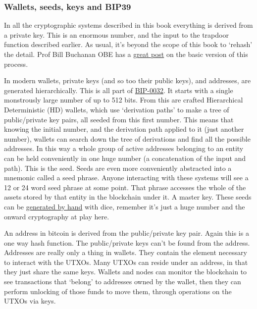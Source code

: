 \subsubsection{Wallets, seeds, keys and BIP39}
In all the cryptographic systems described in this book everything is derived from a private key. This is an enormous number, and the input to the trapdoor function described earlier. As usual, it's beyond the scope of this book to `rehash' the detail. Prof Bill Buchanan OBE has a \href{https://medium.com/asecuritysite-when-bob-met-alice/can-i-derive-the-private-key-from-the-public-key-ba3609256ec}{great post} on the basic version of this process.\par
In modern wallets, private keys (and so too their public keys), and addresses, are generated hierarchically. This is all part of \href{https://github.com/bitcoin/bips/blob/master/bip-0032.mediawiki}{BIP-0032}. It starts with a single monstrously large number of up to 512 bits. From this are crafted Hierarchical Deterministic (HD) wallets, which use `derivation paths' to make a tree of public/private key pairs, all seeded from this first number. This means that knowing the initial number, and the derivation path applied to it (just another number), wallets can search down the tree of derivations and find all the possible addresses. In this way a whole group of active addresses belonging to an entity can be held conveniently in one huge number (a concatenation of the input and path). This is the seed. Seeds are even more conveniently abstracted into a mnemonic called a seed phrase. Anyone interacting with these systems will see a 12 or 24 word seed phrase at some point. That phrase accesses the whole of the assets stored by that entity in the blockchain under it. A master key. These seeds can be \href{https://vault12.com/securemycrypto/cryptocurrency-security-how-to/dice-crypto-recovery-seed/}{generated by hand} with dice, remember it's just a huge number and the onward cryptography at play here.\par
An address in bitcoin is derived from the public/private key pair. Again this is a one way hash function. The public/private keys can't be found from the address. Addresses are really only a thing in wallets. They contain the element necessary to interact with the UTXOs. Many UTXOs can reside under an address, in that they just share the same keys. Wallets and nodes can monitor the blockchain to see transactions that `belong' to addresses owned by the wallet, then they can perform unlocking of those funds to move them, through operations on the UTXOs via keys.\par
